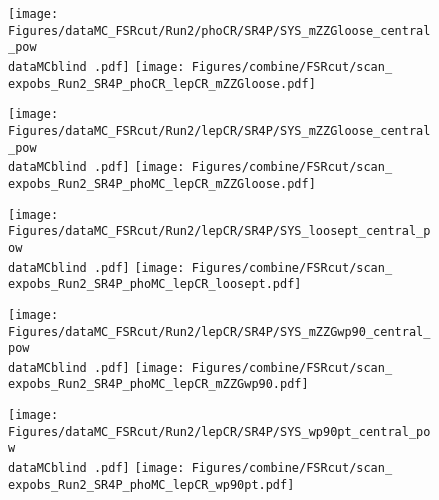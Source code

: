 \label{sec:likelihood_scans_FSRcut}

\begin{figure}
  \centering
  \texttt{[image: Figures/dataMC\_FSRcut/Run2/phoCR/SR4P/SYS\_mZZGloose\_central\_pow\\dataMCblind .pdf]}
  \hfill
  \texttt{[image: Figures/combine/FSRcut/scan\_\\expobs\_Run2\_SR4P\_phoCR\_lepCR\_mZZGloose.pdf]}
  \caption{}
  \label{fig:scan_FSRcut_Run2_SR4P_phoCR_lepCR_mZZGloose}
\end{figure}

\begin{figure}
  \centering
  \texttt{[image: Figures/dataMC\_FSRcut/Run2/lepCR/SR4P/SYS\_mZZGloose\_central\_pow\\dataMCblind .pdf]}
  \hfill
  \texttt{[image: Figures/combine/FSRcut/scan\_\\expobs\_Run2\_SR4P\_phoMC\_lepCR\_mZZGloose.pdf]}
  \caption{}
  \label{fig:scan_FSRcut_Run2_SR4P_phoMC_lepCR_mZZGloose}
\end{figure}

\begin{figure}
  \centering
  \texttt{[image: Figures/dataMC\_FSRcut/Run2/lepCR/SR4P/SYS\_loosept\_central\_pow\\dataMCblind .pdf]}
  \hfill
  \texttt{[image: Figures/combine/FSRcut/scan\_\\expobs\_Run2\_SR4P\_phoMC\_lepCR\_loosept.pdf]}
  \caption{}
  \label{fig:scan_FSRcut_Run2_SR4P_phoMC_lepCR_loosept}
\end{figure}

\begin{figure}
  \centering
  \texttt{[image: Figures/dataMC\_FSRcut/Run2/lepCR/SR4P/SYS\_mZZGwp90\_central\_pow\\dataMCblind .pdf]}
  \hfill
  \texttt{[image: Figures/combine/FSRcut/scan\_\\expobs\_Run2\_SR4P\_phoMC\_lepCR\_mZZGwp90.pdf]}
  \caption{}
  \label{fig:scan_FSRcut_Run2_SR4P_phoMC_lepCR_mZZGwp90}
\end{figure}

\begin{figure}
  \centering
  \texttt{[image: Figures/dataMC\_FSRcut/Run2/lepCR/SR4P/SYS\_wp90pt\_central\_pow\\dataMCblind .pdf]}
  \hfill
  \texttt{[image: Figures/combine/FSRcut/scan\_\\expobs\_Run2\_SR4P\_phoMC\_lepCR\_wp90pt.pdf]}
  \caption{}
  \label{fig:scan_FSRcut_Run2_SR4P_phoMC_lepCR_wp90pt}
\end{figure}

